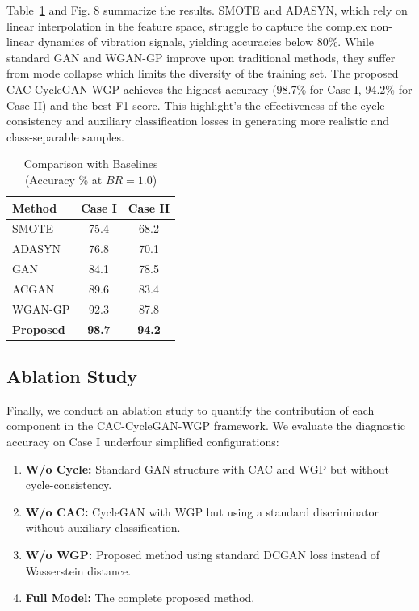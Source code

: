 Table~\ref{tab:comparison} and Fig. 8 summarize the results. SMOTE and ADASYN, which rely on linear interpolation in the feature space, struggle to capture the complex non-linear dynamics of vibration signals, yielding accuracies below $80\%$. While standard GAN and WGAN-GP improve upon traditional methods, they suffer from mode collapse which limits the diversity of the training set. The proposed CAC-CycleGAN-WGP achieves the highest accuracy ($98.7\%$ for Case I, $94.2\%$ for Case II) and the best F1-score. This highlight's the effectiveness of the cycle-consistency and auxiliary classification losses in generating more realistic and class-separable samples.

\begin{table}[htbp]
\centering
\caption{Comparison with Baselines (Accuracy \% at $BR=1.0$)}
\label{tab:comparison}
\begin{tabular}{lcc}
\hline
\textbf{Method} & \textbf{Case I} & \textbf{Case II} \\ \hline
SMOTE \cite{smote} & 75.4 & 68.2 \\
ADASYN \cite{adasyn} & 76.8 & 70.1 \\
GAN \cite{gan} & 84.1 & 78.5 \\
ACGAN \cite{acgan} & 89.6 & 83.4 \\
WGAN-GP \cite{wgangp} & 92.3 & 87.8 \\
\textbf{Proposed} & \textbf{98.7} & \textbf{94.2} \\
\hline
\end{tabular}
\end{table}

\subsection{Ablation Study}
Finally, we conduct an ablation study to quantify the contribution of each component in the CAC-CycleGAN-WGP framework. We evaluate the diagnostic accuracy on Case I underfour simplified configurations:
\begin{enumerate}
    \item \textbf{W/o Cycle:} Standard GAN structure with CAC and WGP but without cycle-consistency.
    \item \textbf{W/o CAC:} CycleGAN with WGP but using a standard discriminator without auxiliary classification.
    \item \textbf{W/o WGP:} Proposed method using standard DCGAN loss instead of Wasserstein distance.
    \item \textbf{Full Model:} The complete proposed method.
\end{enumerate}

